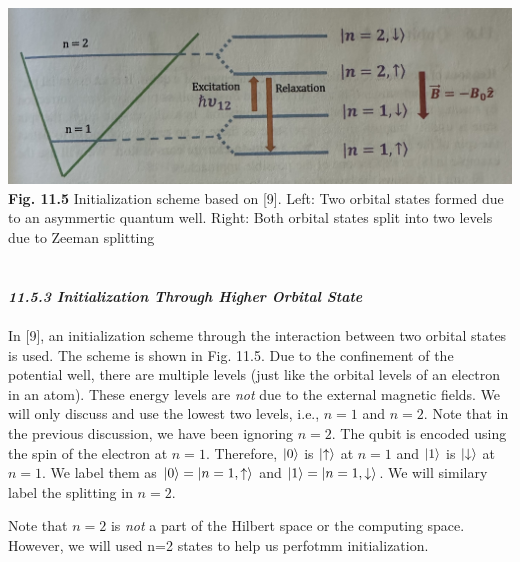 \documentclass{article}
\newcommand{\bfit}[1]{\textit{\textbf{#1}}}
\begin{document}
\includegraphics[scale=0.45]{Fig.11.5.jpeg}\\
\textbf{Fig. 11.5} Initialization scheme based on [9]. Left: Two orbital states formed due to an asymmertic
quantum well. Right: Both orbital states split into two levels due to Zeeman splitting\\\\\\
\bfit{\large 11.5.3 Initialization Through Higher Orbital State}\\\\
In [9], an initialization scheme through the interaction between two orbital states
is used. The scheme is shown in Fig. 11.5. Due to the confinement of the potential well,
there are multiple levels (just like the orbital levels of an electron in an atom). These energy
levels are \textit{not} due to the external magnetic fields. We will only discuss and use the lowest two
levels, i.e., $n=1$ and $n=2$. Note that in the previous discussion, we have been ignoring $n=2$. 
The qubit is encoded using the spin of the electron at $n=1$. Therefore, $\ket{0}$ is $\ket{\uparrow}$ at 
$n=1$ and $\ket{1}$ is $\ket{\downarrow}$ at $n=1$. We label them as $\ket{0}=\ket{n=1,\uparrow}$ and
$\ket{1}=\ket{n=1,\downarrow}$. We will similary label the splitting in $n=2$.

Note that $n=2$ is \textit{not} a part of the Hilbert space or the computing space. However, we will used n=2 states to help us
perfotmm initialization.
\end{document}

